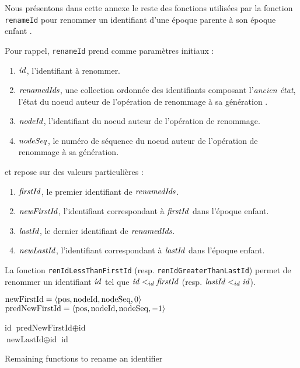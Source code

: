\label{app:rename-id}

Nous présentons dans cette annexe le reste des fonctions utilisées par la fonction \texttt{renameId} pour renommer un identifiant d'une époque parente à son époque enfant .

Pour rappel, \texttt{renameId} prend comme paramètres initiaux :
\begin{enumerate}
    \item $\mathit{id}$, l'identifiant à renommer.
    \item $\mathit{renamedIds}$, une collection ordonnée des identifiants composant l'\emph{ancien état}, \ie l'état du noeud auteur de l'opération de renommage à sa génération .
    \item $\mathit{nodeId}$, l'identifiant du noeud auteur de l'opération de renommage.
    \item $\mathit{nodeSeq}$, le numéro de séquence du noeud auteur de l'opération de renommage à sa génération.
\end{enumerate}
et repose sur des valeurs particulières :
\begin{enumerate}
    \item $\mathit{firstId}$, le premier identifiant de $\mathit{renamedIds}$.
    \item $\mathit{newFirstId}$, l'identifiant correspondant à $\mathit{firstId}$ dans l'époque enfant.
    \item $\mathit{lastId}$, le dernier identifiant de $\mathit{renamedIds}$.
    \item $\mathit{newLastId}$, l'identifiant correspondant à $\mathit{lastId}$ dans l'époque enfant.
\end{enumerate}

La fonction \texttt{renIdLessThanFirstId} (resp. \texttt{renIdGreaterThanLastId}) permet de renommer un identifiant $\mathit{id}$ tel que $\mathit{id} <_{id} \mathit{firstId}$ (resp. $\mathit{lastId} <_{id} \mathit{id}$).

\begin{algorithm}[!ht]
  \footnotesize
  \begin{algorithmic}[1]
      \Statex \Comment $\text{newFirstId} = \langle \text{pos},\text{nodeId},\text{nodeSeq},0 \rangle$
      \Statex \Comment $\text{predNewFirstId} = \langle \text{pos},\text{nodeId},\text{nodeSeq},-1 \rangle$

          \State \Return id
      \Else
          \State \Return $\text{predNewFirstId} \oplus \text{id}$ \label{alg:appendix-rename-id-min}
        \EndIf
      \EndFunction
      \\
              \State \Return $\text{newLastId} \oplus \text{id}$ \label{alg:appendix-rename-id-max}
          \Else
              \State \Return id
          \EndIf
      \EndFunction
  \end{algorithmic}
  \caption{Remaining functions to rename an identifier}
  \label{alg:appendix-rename-id}
\end{algorithm}

